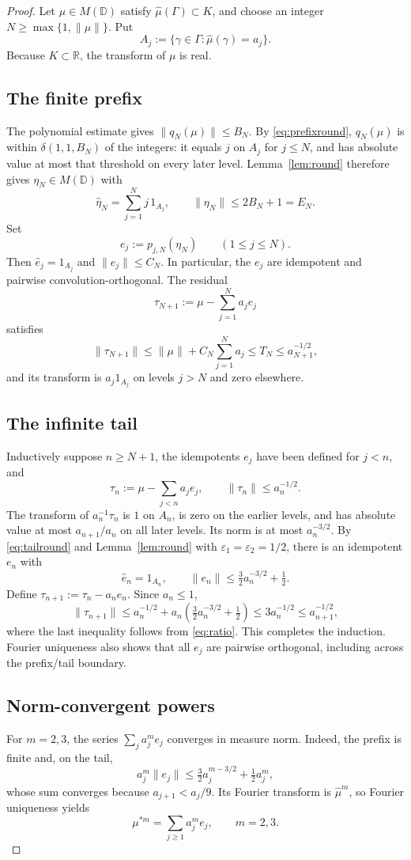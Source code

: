 \documentclass[11pt]{article}
\newcommand{\D}{\mathbb D}
\newcommand{\M}{M}
\newcommand{\wh}{\widehat}
\begin{document}
\begin{proof}
Let $\mu\in\M(\D)$ satisfy $\wh\mu(\Gamma)\subset K$, and choose an integer
$N\geq\max\{1,\|\mu\|\}$.  Put
\[
 A_j:=\{\gamma\in\Gamma:\wh\mu(\gamma)=a_j\}.
\]
Because $K\subset\mathbb R$, the transform of $\mu$ is real.

\subsection*{The finite prefix}
The polynomial estimate gives $\|q_N(\mu)\|\leq B_N$.  By
\eqref{eq:prefixround}, $q_N(\wh\mu)$ is within
$\delta(1,1,B_N)$ of the integers: it equals $j$ on $A_j$ for
$j\leq N$, and has absolute value at most that threshold on every later
level.  Lemma~\ref{lem:round} therefore gives $\eta_N\in\M(\D)$ with
\[
 \wh\eta_N=\sum_{j=1}^N j\,1_{A_j},
 \qquad \|\eta_N\|\leq2B_N+1=E_N.
\]
Set
\[
 e_j:=p_{j,N}(\eta_N)\qquad(1\leq j\leq N).
\]
Then $\wh e_j=1_{A_j}$ and $\|e_j\|\leq C_N$.  In particular, the
$e_j$ are idempotent and pairwise convolution-orthogonal.  The residual
\[
 \tau_{N+1}:=\mu-\sum_{j=1}^N a_je_j
\]
satisfies
\[
 \|\tau_{N+1}\|
 \leq\|\mu\|+C_N\sum_{j=1}^Na_j
 \leq T_N\leq a_{N+1}^{-1/2},
\]
and its transform is $a_j1_{A_j}$ on levels $j>N$ and zero elsewhere.

\subsection*{The infinite tail}
Inductively suppose $n\geq N+1$, the idempotents $e_j$ have been defined
for $j<n$, and
\[
 \tau_n:=\mu-\sum_{j<n}a_je_j,
 \qquad \|\tau_n\|\leq a_n^{-1/2}.
\]
The transform of $a_n^{-1}\tau_n$ is $1$ on $A_n$, is zero on the
earlier levels, and has absolute value at most $a_{n+1}/a_n$ on all later
levels.  Its norm is at most $a_n^{-3/2}$.  By
\eqref{eq:tailround} and Lemma~\ref{lem:round} with
$\varepsilon_1=\varepsilon_2=1/2$, there is an idempotent $e_n$ with
\[
 \wh e_n=1_{A_n},
 \qquad
 \|e_n\|\leq\tfrac32a_n^{-3/2}+\tfrac12.
\]
Define $\tau_{n+1}:=\tau_n-a_ne_n$.  Since $a_n\leq1$,
\[
 \|\tau_{n+1}\|
 \leq a_n^{-1/2}+a_n\!\left(\tfrac32a_n^{-3/2}+\tfrac12\right)
 \leq3a_n^{-1/2}
 \leq a_{n+1}^{-1/2},
\]
where the last inequality follows from \eqref{eq:ratio}.  This completes
the induction.  Fourier uniqueness also shows that all $e_j$ are pairwise
orthogonal, including across the prefix/tail boundary.

\subsection*{Norm-convergent powers}
For $m=2,3$, the series $\sum_j a_j^m e_j$ converges in measure norm.
Indeed, the prefix is finite and, on the tail,
\[
 a_j^m\|e_j\|
 \leq\tfrac32a_j^{m-3/2}+\tfrac12a_j^m,
\]
whose sum converges because $a_{j+1}<a_j/9$.  Its Fourier transform is
$\wh\mu^m$, so Fourier uniqueness yields
\begin{equation}\label{eq:powers}
 \mu^{*m}=\sum_{j\geq1}a_j^m e_j,
 \qquad m=2,3.
\end{equation}


\end{proof}
\end{document}
